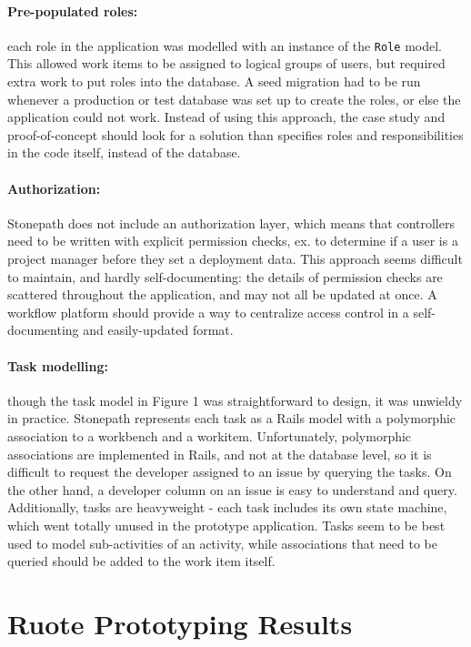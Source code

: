 \documentclass[document.tex]{subfiles}
\begin{document}
\paragraph{Pre-populated roles:} each role in the application was modelled with an instance of the \verb!Role! model. This allowed work items to be assigned to logical groups of users, but required extra work to put roles into the database. A seed migration had to be run whenever a production or test database was set up to create the roles, or else the application could not work. Instead of using this approach, the case study and proof-of-concept should look for a solution than specifies roles and responsibilities in the code itself, instead of the database.

\paragraph{Authorization:} Stonepath does not include an authorization layer, which means that controllers need to be written with explicit permission checks, ex. to determine if a user is a project manager before they set a deployment data. This approach seems difficult to maintain, and hardly self-documenting: the details of permission checks are scattered throughout the application, and may not all be updated at once. A workflow platform should provide a way to centralize access control in a self-documenting and easily-updated format.

\paragraph{Task modelling:} though the task model in Figure 1 was straightforward to design, it was unwieldy in practice. Stonepath represents each task as a Rails model with a polymorphic association to a workbench and a workitem. Unfortunately, polymorphic associations are implemented in Rails, and not at the database level, so it is difficult to request the developer assigned to an issue by querying the tasks. On the other hand, a developer column on an issue is easy to understand and query. Additionally, tasks are heavyweight - each task includes its own state machine, which went totally unused in the prototype application. Tasks seem to be best used to model sub-activities of an activity, while associations that need to be queried should be added to the work item itself.


\FloatBarrier

\section {Ruote Prototyping Results}
\label {sec:ruote-prototyping-results}
\end{document}

